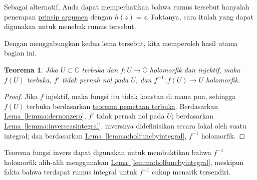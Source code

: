 \documentclass[12pt,openany]{book}
\newcommand{\C}{{\mathbb{C}}}
\theoremstyle{plain}
\newtheorem{thm}{Teorema}[section]
\theoremstyle{remark}
\theoremstyle{definition}
\theoremstyle{exercise}
\theoremstyle{example}
\newcommand{\lemmaref}[1]{\hyperref[#1]{Lema~\ref*{#1}}}
\begin{document}
Sebagai alternatif, Anda dapat memperhatikan bahwa rumus tersebut hanyalah penerapan
\hyperref[thm:argprinc]{prinsip argumen} dengan $h(z)=z$.
Faktanya, cara itulah yang dapat digunakan untuk menebak rumus tersebut.

Dengan menggabungkan kedua lema tersebut, kita memperoleh hasil utama bagian ini.

\begin{thm}
Jika $U \subset \C$ terbuka dan $f \colon U \to \C$ holomorfik dan
injektif, maka $f(U)$ terbuka, $f'$ tidak pernah nol pada $U$, dan $f^{-1}
\colon f(U) \to U$ holomorfik.
\end{thm}

\begin{proof}
Jika $f$ injektif, maka fungsi itu tidak konstan di mana pun, sehingga $f(U)$ terbuka berdasarkan
\hyperref[thm:OMT]{teorema pemetaan terbuka}.
Berdasarkan \lemmaref{lemma:dernonzero}, $f'$ tidak pernah nol
pada $U$; berdasarkan \lemmaref{lemma:inverseasintegral}, inversnya didefinisikan secara lokal
oleh suatu integral; dan berdasarkan
\lemmaref{lemma:holfuncbyintegral},
$f^{-1}$ holomorfik.
\end{proof}

Teorema fungsi invers dapat digunakan untuk membuktikan bahwa $f^{-1}$
holomorfik alih-alih menggunakan \lemmaref{lemma:holfuncbyintegral}, meskipun
fakta bahwa terdapat rumus integral untuk $f^{-1}$ cukup menarik
tersendiri.
\end{document}
